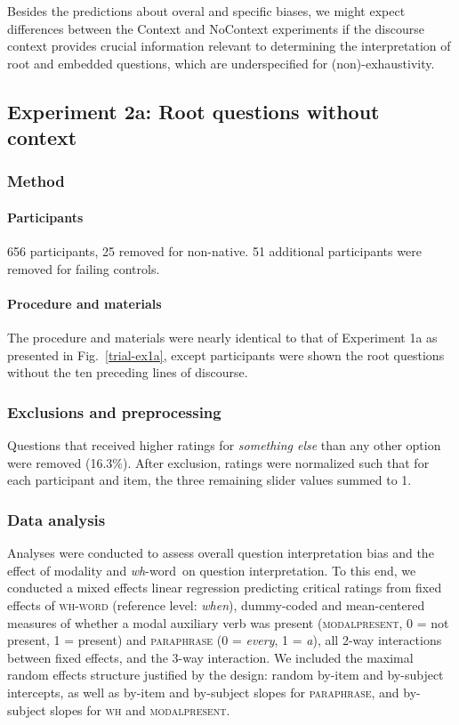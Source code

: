\documentclass[12pt,letterpaper,table,svgnames,dvipsnames]{article}
\newcommand{\figref}[1]{Fig.~\ref{#1}}
\newcommand{\whw}{\emph{wh}-word~}
\begin{document}
Besides the predictions about overal and specific biases, we might expect differences between the Context and NoContext experiments if the discourse context provides crucial information relevant to determining the interpretation of root and embedded questions, which are underspecified for (non)-exhaustivity.

\subsection{Experiment 2a: Root questions without context}


\subsubsection{Method}

\paragraph{Participants}
656 participants, 25 removed for non-native. 51 additional participants were removed for failing controls.

\paragraph{Procedure and materials}
The procedure and materials were nearly identical to that of Experiment 1a as presented in \figref{trial-ex1a}, except participants were shown the root questions without the ten preceding lines of discourse.


\subsubsection{Exclusions and preprocessing}
Questions that received higher ratings for \emph{something else} than any other option were removed (16.3\%). After exclusion, ratings were normalized such that for each participant and item, the three remaining slider values summed to 1.

\subsubsection{Data analysis}
Analyses were conducted to assess overall question interpretation bias and the effect of modality and \whw on question interpretation. To this end, we conducted a mixed effects linear regression predicting critical ratings from fixed effects of \textsc{wh-word} (reference level: \emph{when}), dummy-coded and mean-centered measures of whether a modal auxiliary verb was present (\textsc{modalpresent}, 0 = not present, 1 = present) and \textsc{paraphrase} (0 = \emph{every}, 1 = \emph{a}), all 2-way interactions between fixed effects, and the 3-way interaction. We included the maximal random effects structure justified by the design: random by-item and by-subject intercepts, as well as by-item and by-subject slopes for \textsc{paraphrase}, and by-subject slopes for \textsc{wh} and \textsc{modalpresent}. 
\end{document}
